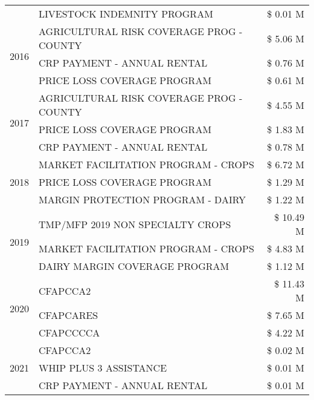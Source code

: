 \begin{tabular}{llr}
 & LIVESTOCK INDEMNITY PROGRAM & \$ 0.01 M \\
\cline{1-3}
\multirow[t]{3}{*}{2016} & AGRICULTURAL RISK COVERAGE PROG - COUNTY      & \$ 5.06 M \\
 & CRP PAYMENT - ANNUAL RENTAL                   & \$ 0.76 M \\
 & PRICE LOSS COVERAGE PROGRAM                   & \$ 0.61 M \\
\cline{1-3}
\multirow[t]{3}{*}{2017} & AGRICULTURAL RISK COVERAGE PROG - COUNTY & \$ 4.55 M \\
 & PRICE LOSS COVERAGE PROGRAM & \$ 1.83 M \\
 & CRP PAYMENT - ANNUAL RENTAL & \$ 0.78 M \\
\cline{1-3}
\multirow[t]{3}{*}{2018} & MARKET FACILITATION PROGRAM - CROPS & \$ 6.72 M \\
 & PRICE LOSS COVERAGE PROGRAM & \$ 1.29 M \\
 & MARGIN PROTECTION PROGRAM - DAIRY & \$ 1.22 M \\
\cline{1-3}
\multirow[t]{3}{*}{2019} & TMP/MFP 2019 NON SPECIALTY CROPS & \$ 10.49 M \\
 & MARKET FACILITATION PROGRAM - CROPS & \$ 4.83 M \\
 & DAIRY MARGIN COVERAGE PROGRAM & \$ 1.12 M \\
\cline{1-3}
\multirow[t]{3}{*}{2020} & CFAPCCA2 & \$ 11.43 M \\
 & CFAPCARES & \$ 7.65 M \\
 & CFAPCCCCA & \$ 4.22 M \\
\cline{1-3}
\multirow[t]{3}{*}{2021} & CFAPCCA2 & \$ 0.02 M \\
 & WHIP PLUS 3 ASSISTANCE & \$ 0.01 M \\
 & CRP PAYMENT - ANNUAL RENTAL & \$ 0.01 M \\
\cline{1-3}
\bottomrule
\end{tabular}
